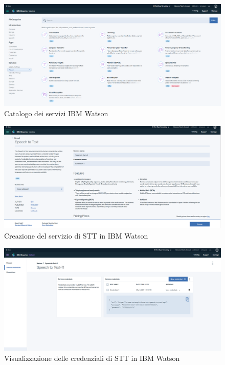 \begin{figure}[H]
	\centerline{\includegraphics[width=1\textwidth,height=\textheight,keepaspectratio]{sezioni/images/watson.PNG}}
	\caption{Catalogo dei servizi IBM Watson}\label{fig:consoleWatson}
\end{figure}
\begin{figure}[H]
	\centerline{\includegraphics[width=1\textwidth,height=\textheight,keepaspectratio]{sezioni/images/watson-create.PNG}}
	\caption{Creazione del servizio di STT in IBM Watson}\label{fig:serviceWatson}
\end{figure}
\begin{figure}[H]
	\centerline{\includegraphics[width=1\textwidth,height=\textheight,keepaspectratio]{sezioni/images/watson-credentials.PNG}}
	\caption{Visualizzazione delle credenziali di STT in IBM Watson}\label{fig:credentialsWatson}
\end{figure}
\newpage
